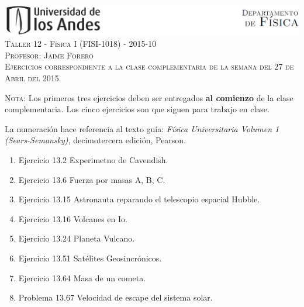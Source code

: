 \documentclass[letterpaper,10pt,onecolumn]{article}
\begin{document}
\begin{center}

\includegraphics[width=490pt]{figs/header.png}\\[0.5cm]

\textsc{\LARGE Taller 12 - F\'isica I (FISI-1018) - 2015-10}\\[0.5cm]

\textsc{\Large{Profesor: Jaime Forero}} \\[0.5cm]

\noindent\textsc{Ejercicios correspondiente a la clase complementaria
  de la semana del 27 de Abril del 2015.}\\[0.5cm]
\end{center}

\noindent\textsc{Nota:} Los primeros tres ejercicios deben ser
entregados {\bf al comienzo} de la clase complementaria.  Los cinco ejercicios son que siguen para trabajo en clase.

La numeraci\'on hace referencia al texto
gu\'ia: \textit{F\'isica Universitaria Volumen  1 (Sears-Semansky)},
decimotercera edici\'on, Pearson. 

\begin{enumerate}
\item Ejercicio 13.2 Experimetno de Cavendish.
\item Ejercicio 13.6 Fuerza por masas A, B, C.
\item Ejercicio 13.15 Astronauta reparando el telescopio espacial Hubble.
\item Ejercicio 13.16 Volcanes en Io.
\item Ejercicio 13.24 Planeta Vulcano.
\item Ejercicio 13.51 Sat\'elites Geosincr\'onicos.
\item Ejercicio 13.64 Masa de un cometa.
\item Problema 13.67 Velocidad de escape del sistema solar.
\end{enumerate}
\end{document}
